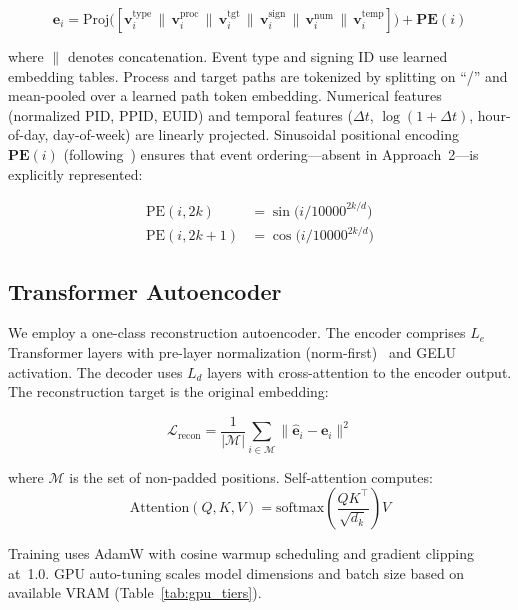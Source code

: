 \documentclass[letterpaper,twocolumn,10pt]{article}
\begin{document}
\begin{equation}
\mathbf{e}_i = \text{Proj}\Big(
[\mathbf{v}^{\text{type}}_i \,\|\,
 \mathbf{v}^{\text{proc}}_i \,\|\,
 \mathbf{v}^{\text{tgt}}_i  \,\|\,
 \mathbf{v}^{\text{sign}}_i \,\|\,
 \mathbf{v}^{\text{num}}_i  \,\|\,
 \mathbf{v}^{\text{temp}}_i]
\Big) + \mathbf{PE}(i)
\label{eq:embedding}
\end{equation}

\noindent where $\|$ denotes concatenation.  Event type and signing
ID use learned embedding tables.  Process and target paths are
tokenized by splitting on ``/'' and mean-pooled over a learned path
token embedding.  Numerical features (normalized PID, PPID, EUID)
and temporal features ($\Delta t$, $\log(1{+}\Delta t)$,
hour-of-day, day-of-week) are linearly projected.  Sinusoidal
positional encoding $\mathbf{PE}(i)$ (following~\cite{vaswani})
ensures that event ordering---absent in Approach~2---is explicitly
represented:

\begin{align}
\text{PE}(i, 2k)   &= \sin\!\big(i / 10000^{2k/d}\big) \\
\text{PE}(i, 2k{+}1) &= \cos\!\big(i / 10000^{2k/d}\big)
\end{align}


\subsection{Transformer Autoencoder}

We employ a one-class reconstruction autoencoder.  The encoder
comprises $L_e$ Transformer layers with pre-layer normalization
(norm-first)~\cite{xiong2020layer} and GELU activation.  The
decoder uses $L_d$ layers with cross-attention to the encoder
output.  The reconstruction target is the original embedding:

\begin{equation}
\mathcal{L}_{\text{recon}} = \frac{1}{|\mathcal{M}|}
\sum_{i \in \mathcal{M}}
\|\hat{\mathbf{e}}_i - \mathbf{e}_i\|^2
\label{eq:loss}
\end{equation}

\noindent where $\mathcal{M}$ is the set of non-padded positions.
Self-attention computes:
\begin{equation}
\text{Attention}(Q,K,V) =
\text{softmax}\!\left(\frac{QK^\top}{\sqrt{d_k}}\right) V
\end{equation}

Training uses AdamW with cosine warmup scheduling and gradient
clipping at~1.0.  GPU auto-tuning scales model dimensions and batch
size based on available VRAM (Table~\ref{tab:gpu_tiers}).
\end{document}

